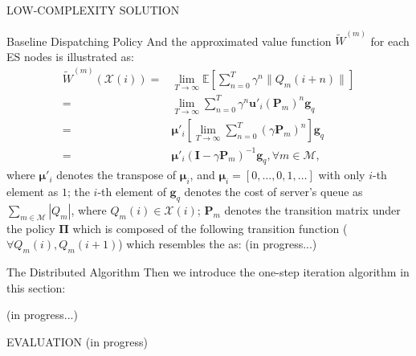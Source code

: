 \documentclass[10pt, conference, letterpaper]{IEEEtran}
\newcommand{\mat}{\mathbf}
\renewcommand{\vec}{\mathbf}
\newcommand{\esSet}{\mathcal{M}}
\newcommand{\Obsv}{\mathcal{X}}
\begin{document}
\begin{section}{LOW-COMPLEXITY SOLUTION}
\begin{subsection}{Baseline Dispatching Policy}
            And the approximated value function $\tilde{W}^{(m)}$ for each ES nodes is illustrated as:
            \begin{align}
                \tilde{W}^{(m)}(\Obsv(i)) =& \lim_{T\to\infty} \mathbb{E}[\sum_{n=0}^{T} \gamma^{n} \|Q_m(i+n)\|]
                \nonumber\\
                =& \lim_{T\to\infty} \sum_{n=0}^{T} \gamma^{n} \vec{u}'_i (\mat{P}_m)^{n} \vec{g}_q
                \nonumber\\
                =& \vec{\mu}'_i [\lim_{T\to\infty} \sum_{n=0}^{T} (\gamma \mat{P}_m)^{n}] \vec{g}_q
                \nonumber\\
                =& \vec{\mu}'_i (\mat{I} - \gamma \mat{P}_m)^{-1} \vec{g}_q, \forall m\in\esSet,
            \end{align}
            where $\vec{\mu}'_i$ denotes the transpose of $\vec{\mu}_i$, and $\vec{\mu}_i = [0,\dots,0,1,\dots]$ with only $i$-th element as $1$; the $i$-th element of $\vec{g}_q$ denotes the cost of server's queue as $\sum_{m\in\esSet} |Q_m|$, where $Q_m(i) \in \Obsv(i)$; $\mat{P}_m$ denotes the transition matrix under the policy $\vec{\Pi}$ which is composed of the following transition function ($\forall Q_m(i),Q_m(i+1)$) which resembles the as:
            (in progress...)
        \end{subsection}

        \begin{subsection}{The Distributed Algorithm}
            Then we introduce the one-step iteration algorithm in this section:
            \begin{algorithm}[H]
                \caption{Distributed Algorithm for $k$-th AP}
                \begin{algorithmic}
                    \WHILE{\TRUE}
                        \STATE (in progress...)
                    \ENDWHILE
                \end{algorithmic}
            \end{algorithm}
        \end{subsection}
        
    \end{section}

    \begin{section}{EVALUATION}
        \label{sec:evaluation}
        (in progress)
    \end{section}
\end{document}
